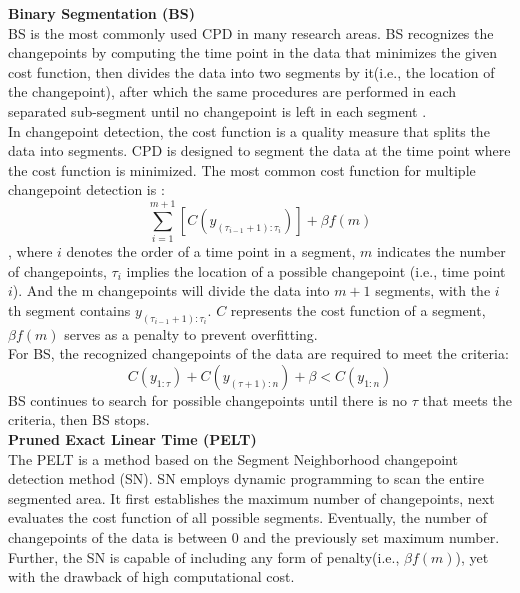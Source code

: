 \documentclass[]{interact}
\theoremstyle{plain}%
\theoremstyle{definition}
\theoremstyle{remark}
\begin{document}
\hspace{-0.55cm} \textbf{Binary Segmentation (BS)}\\

BS is the most commonly used CPD in many research areas. BS recognizes the changepoints by computing the time point in the data that minimizes the given cost function, then divides the data into two segments by it(i.e., the location of the changepoint), after which the same procedures are performed in each separated sub-segment until no changepoint is left in each segment \cite{killickOptimalDetectionChangepoints2012}. \\

In changepoint detection, the cost function is a quality measure that splits the data into segments. CPD is designed to segment the data at the time point where the cost function is minimized. The most common cost function for multiple changepoint detection is \cite{killickOptimalDetectionChangepoints2012}:
\begin{equation} \label{8}
	\sum_{i = 1} ^{m + 1} \left[C(y_{({\tau_{i-1} + 1}):\tau_{i}}) \right] + \beta f(m)
\end{equation}
, where $i$ denotes the order of a time point in a segment, $m$ indicates the number of changepoints, $\tau_i$ implies the location of a possible changepoint (i.e., time point $i$). And the m changepoints will divide the data into $m+1$ segments, with the $i$th segment contains $y_{({\tau_{i-1} + 1}):\tau_{i}}$. $C$ represents the cost function of a segment, $\beta f(m)$ serves as a penalty to prevent overfitting. \\

For BS, the recognized changepoints of the data are required to meet the criteria:
\begin{equation} \label{9}
	C(y_{1:\tau}) + C(y_{({\tau + 1}):n}) + \beta < C(y_{1:n})
\end{equation}
BS continues to search for possible changepoints until there is no $\tau$ that meets the criteria, then BS stops. \\

\hspace{-0.55cm} \textbf{Pruned Exact Linear Time (PELT)}\\

The PELT is a method based on the Segment Neighborhood changepoint detection method (SN)\cite{augerAlgorithmsOptimalIdentification1989}. SN employs dynamic programming to scan the entire segmented area. It first establishes the maximum number of changepoints, next evaluates the cost function of all possible segments. Eventually, the number of changepoints of the data is between 0 and the previously set maximum number. Further, the SN is capable of including any form of penalty(i.e., $\beta f(m)$), yet with the drawback of high computational cost. \\
\end{document}
